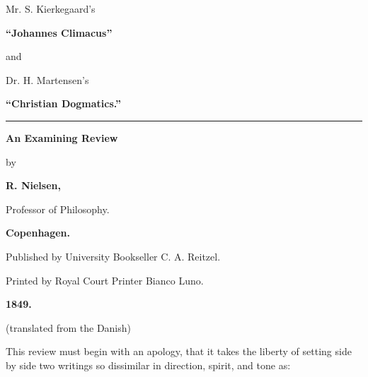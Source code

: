\documentclass[12pt]{book}
\begin{document}
\begin{titlepage}
\centering
\vspace*{2.0cm}
{\Large Mr. S. Kierkegaard's\par}
\vspace{0.5cm}
{\Huge\bfseries ``Johannes Climacus''\par}
\vspace{1.0cm}
{\Large and\par}
\vspace{1.0cm}
{\Large Dr. H. Martensen's\par}
\vspace{0.5cm}
{\Huge\bfseries ``Christian Dogmatics.''\par}
\vspace{1.6cm}
\rule{4cm}{0.4pt}\par
\vspace{1.6cm}
{\LARGE\bfseries An Examining Review\par}
\vspace{0.6cm}
{\large by\par}
\vspace{0.6cm}
{\LARGE\bfseries R. Nielsen,\par}
\vspace{0.25cm}
{\small Professor of Philosophy.\par}
\vfill
{\large\bfseries Copenhagen.\par}
{\small Published by University Bookseller C. A. Reitzel.\par}
{\footnotesize Printed by Royal Court Printer Bianco Luno.\par}
{\large\bfseries 1849.\par}
\vspace{0.4cm}
{\small (translated from the Danish)\par}
\end{titlepage}

\frontmatter
\mainmatter
\setcounter{page}{3}


This review must begin with an apology, that it takes the liberty of setting side by side two writings so dissimilar in direction, spirit, and tone as:
\end{document}
